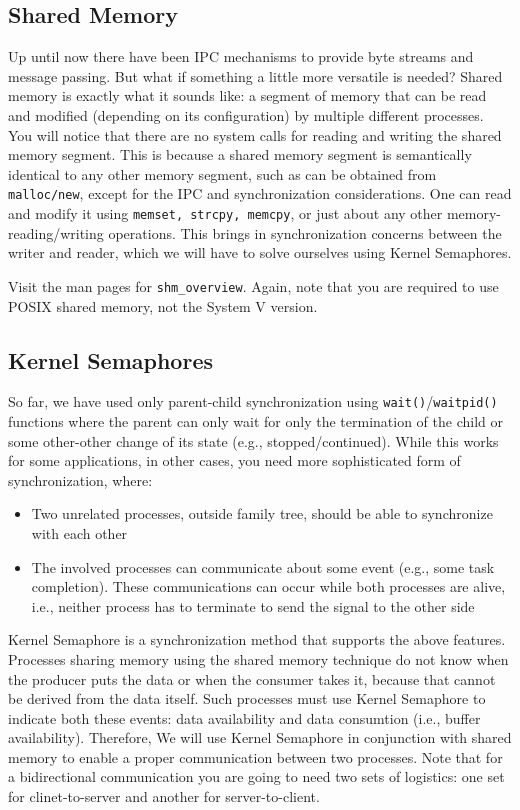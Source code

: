 \documentclass[12pt]{extarticle}
\begin{document}
\subsection*{Shared Memory}
Up until now there have been IPC mechanisms to provide byte streams and message passing. But what if something a little more versatile is needed? Shared memory is exactly what it sounds like: a segment of memory that can be read and modified (depending on its configuration) by multiple different processes. You will notice that there are no system calls for reading and writing the shared memory segment. This is because a shared memory segment is semantically identical to any other memory segment, such as can be obtained from \texttt{malloc/new}, except for the IPC and synchronization considerations. One can read and modify it using \texttt{memset, strcpy, memcpy}, or just about any other memory-reading/writing operations. This brings in synchronization concerns between the writer and reader, which we will have to solve ourselves using Kernel Semaphores.

Visit the man pages for \texttt{shm\_overview}. Again, note that you are required to use POSIX shared memory, not the System V version.

\subsection*{Kernel Semaphores}
So far, we have used only parent-child synchronization using \texttt{wait()}/\texttt{waitpid()} functions where the parent can only wait for only the termination of the child or some other-other change of its state (e.g., stopped/continued). While this works for some applications, in other cases, you need more sophisticated form of synchronization, where:
\begin{itemize}
    \item Two unrelated processes, outside family tree, should be able to synchronize with each other
    \item The involved processes can communicate about some event (e.g., some task completion). These communications can occur while both processes are alive, i.e., neither process has to terminate to send the signal to the other side
\end{itemize}

Kernel Semaphore is a synchronization method that supports the above features. Processes sharing memory using the shared memory technique do not know when the producer puts the data or when the consumer takes it, because that cannot be derived from the data itself. Such processes must use Kernel Semaphore to indicate both these events: data availability and data consumtion (i.e., buffer availability). Therefore, We will use Kernel Semaphore in conjunction with shared memory to enable a proper communication between two processes. Note that for a bidirectional communication you are going to need two sets of logistics: one set for clinet-to-server and another for server-to-client.
\end{document}
